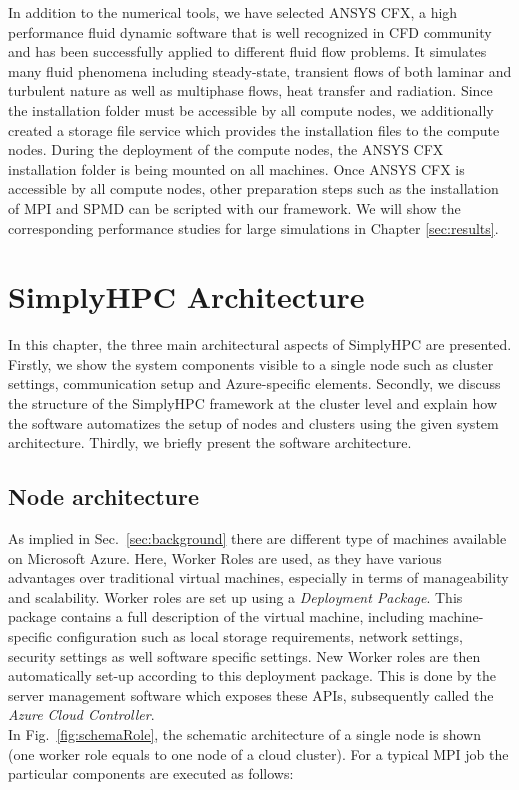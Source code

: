 \documentclass[3p,times]{elsarticle}
\begin{document}
In addition to the numerical tools, we have selected ANSYS CFX, a high performance fluid dynamic software that is well recognized in CFD community and has been successfully applied to different fluid flow problems. It simulates many fluid phenomena including steady-state, transient flows of both laminar and turbulent nature as well as multiphase flows, heat transfer and radiation. Since the installation folder must be accessible by all compute nodes, we additionally created a storage file service which provides the installation files to the compute nodes. During the deployment of the compute nodes, the ANSYS CFX installation folder is being mounted on all machines. Once ANSYS CFX is accessible by all compute nodes, other preparation steps such as the installation of MPI and SPMD can be scripted with our framework. We will show the corresponding performance studies for large simulations in Chapter \ref{sec:results}.

\section{SimplyHPC Architecture}
\label{sec:architecture}
In this chapter, the three main architectural aspects of SimplyHPC are presented. Firstly, we show the system components visible to a single node such as cluster settings, communication setup and Azure-specific elements. Secondly, we discuss the structure of the SimplyHPC framework at the cluster level and explain how the software automatizes the setup of nodes and clusters using the given system architecture. Thirdly, we briefly present the software architecture.

\subsection{Node architecture}

As implied in Sec.~\ref{sec:background} there are different type of machines available on Microsoft Azure. Here, Worker Roles are used, as they have various advantages over traditional virtual machines, especially in terms of manageability and scalability. 
Worker roles are set up using a \textit{Deployment Package}. This package contains a full description of the virtual machine, including machine-specific configuration such as local storage requirements, network settings, security settings as well software specific settings. New Worker roles are then automatically set-up according to this deployment package. This is done by the server management software which exposes these APIs, subsequently called the \textit{Azure Cloud Controller}. \\
In Fig.~\ref{fig:schemaRole}, the schematic architecture of a single node is shown (one worker role equals to one node of a cloud cluster). For a typical MPI job the particular components are executed as follows: 
\end{document}
